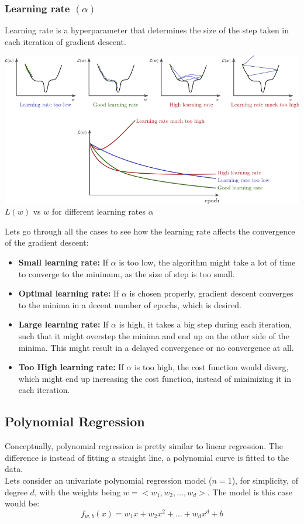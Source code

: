 \documentclass[12pt]{article}
\begin{document}
\subsubsection*{Learning rate $(\alpha)$}
Learning rate is a hyperparameter that determines the size of the step taken in each iteration of gradient descent. 
\begin{center}
    \includegraphics*[width=\textwidth]{lr-types.png}
    $L(w)$ vs $w$ for different learning rates $\alpha$
\end{center}
Lets go through all the cases to see how the learning rate affects the convergence of the gradient descent:
\begin{itemize}
    \item \textbf{Small learning rate:} If $\alpha$ is too low, the algorithm might take a lot of time to converge to the minimum, as the size of step is too small.
    \item \textbf{Optimal learning rate:} If $\alpha$ is chosen properly, gradient descent converges to the minima in a decent number of epochs, which is desired.
    \item \textbf{Large learning rate:} If $\alpha$ is high, it takes a big step during each iteration, such that it might overstep the minima and end up on the other side of the minima. This might result in a delayed convergence or no convergence at all.
    \item \textbf{Too High learning rate:} If $\alpha$ is too high, the cost function would diverg, which might end up increasing the cost function, instead of minimizing it in each iteration.
\end{itemize}

\subsection{Polynomial Regression}
Conceptually, polynomial regression is pretty similar to linear regression. The difference is instead of fitting a straight line, a polynomial curve is fitted to the data.\\
Lets consider an univariate polynomial regression model ($n=1$), for simplicity, of degree $d$, with the weights being $w=<w_1,w_2,\dots,w_d>$. The model is this case would be:
\begin{equation}
    f_{w,b}(x) = w_1x + w_2x^2 + \dots + w_dx^d + b
\end{equation}
\end{document}
